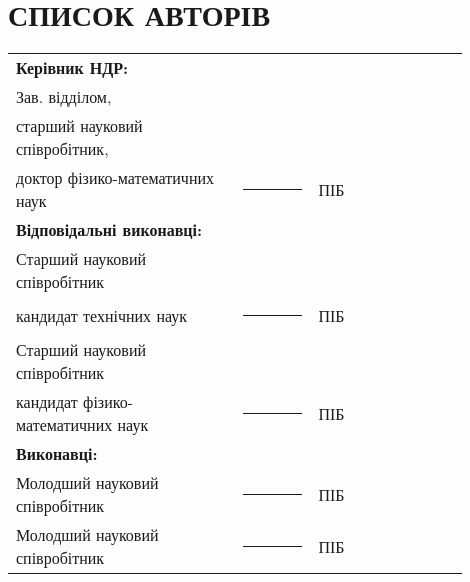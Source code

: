 \chapter*{СПИСОК АВТОРІВ}


\begin{longtable}{p{0.45\linewidth}p{0.15\linewidth}p{0.3\linewidth}}
\textbf{Керівник НДР:} & &\\
Зав. відділом, & & \\
старший науковий співробітник, & & \\
доктор фізико-математичних наук & \rule{1\linewidth}{0.1pt} & ПІБ\\

\textbf{Відповідальні виконавці:} & &\\
Старший науковий співробітник & & \\
кандидат технічних наук & \rule{1\linewidth}{0.1pt} & ПІБ\\
Старший науковий співробітник & & \\
кандидат фізико-математичних наук & \rule{1\linewidth}{0.1pt} & ПІБ\\

\textbf{Виконавці:} & & \\
Молодший науковий співробітник & \rule{1\linewidth}{0.1pt} & ПІБ\\
Молодший науковий співробітник & \rule{1\linewidth}{0.1pt} & ПІБ\\
\end{longtable}
